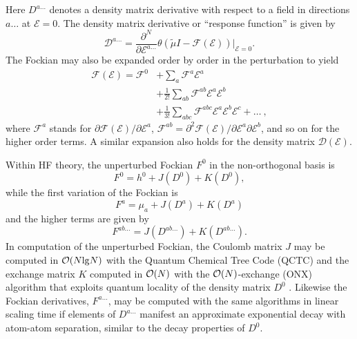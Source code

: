 \documentclass[prl,aps,letterpaper,twocolumn,showpacs,twocolumngrid,superbib]{revtex4}
\def\F{\mathcal{F}}
\def\D{\mathcal{D}}
\def\E{\mathcal{E}}
\begin{document}
Here $D^{a\ldots}$ denotes a density matrix derivative with respect to a field in directions $a\ldots$ 
at $\mathcal{E} = 0$.  The  density matrix derivative or ``response function'' is given by 
\begin{equation}
 \displaystyle\D^{a\ldots}=
 \frac{\partial^N}{\partial\E^{a\ldots}}\theta(\tilde{\mu}I-
 \F(\E))\bigg|_{\E=0} \label{DDeriv1}.
\end{equation}
 The Fockian may also be expanded order by order in the perturbation to yield
\begin{equation}\label{FockianTaylor}
  \begin{split}
    \F(\E)=\F^{0} & +\sum_a \F^{a}\E^{a}\\
    &+\frac{1}{2!}\sum_{ab} \F^{ab}\E^{a}\E^{b}\\
    &+\frac{1}{3!}\sum_{abc} \F^{abc}\E^{a}\E^{b}\E^{c}+\dots ~,
  \end{split}
\end{equation}
where $\F^{a}$ stands for $\partial\F(\E)/\partial\E^{a}$,
$\F^{ab}=\partial^2\F(\E)/\partial\E^{a}\partial\E^{b}$,
and so on for the higher order terms.
A similar expansion also holds for the density matrix $\D(\E)$.

Within HF theory, the unperturbed Fockian $F^0$ in the non-orthogonal basis is 
\begin{equation}
F^0=h^0+J(D^0)+K(D^0), \label{fockian0}
\end{equation}
while the first variation of the Fockian is 
\begin{equation}
F^a=\mu_a+J(D^a)+K(D^a)
\end{equation}
and the higher terms are given by 
\begin{equation}
F^{ab\ldots}=J(D^{ab\ldots})+K(D^{ab\ldots}). \label{fockianN}
\end{equation}
In computation of the unperturbed Fockian, the Coulomb matrix $J$ may be computed in ${\cal O}(N{\rm lg}N)$ 
with the Quantum Chemical Tree Code (QCTC) \cite{MChallacombe97} and the
exchange matrix $K$ computed in ${\cal O}(N)$ with the ${\cal O}(N)$-exchange  (ONX) algorithm 
that exploits quantum locality of the density matrix $D^0$ \cite{ESchwegler97}.
Likewise the Fockian derivatives, $F^{a\ldots}$, may be computed 
with the same algorithms in linear scaling time if elements of 
$D^{a\ldots}$ manifest an approximate exponential decay with atom-atom separation, 
similar to the decay properties of $D^0$. 
\end{document}
